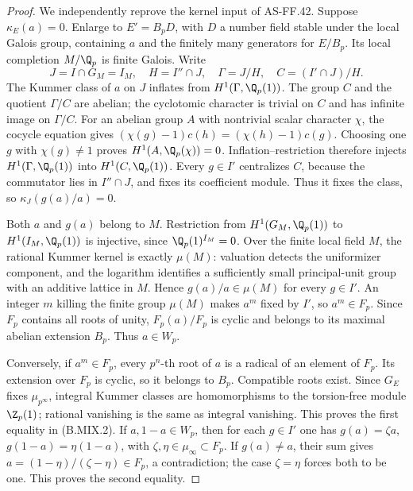\begin{proof}
We independently reprove the kernel input of AS-FF.42. Suppose
\(\kappa_E(a)=0\). Enlarge to \(E'=B_pD\), with \(D\) a number
field stable under the local Galois group, containing \(a\) and the
finitely many generators for \(E/B_p\). Its local completion
\(M/\Q_p\) is finite Galois. Write
\[
 J=I\cap G_M=I_M,\quad H=I''\cap J,
 \quad\Gamma=J/H,\quad C=(I'\cap J)/H.
\]
The Kummer class of \(a\) on \(J\) inflates from
\(H^1(\Gamma,\Q_p(1))\). The group \(C\) and the quotient
\(\Gamma/C\) are abelian; the cyclotomic character is trivial
on \(C\) and has infinite image on \(\Gamma/C\).
For an abelian group \(A\) with nontrivial scalar character \(\chi\),
the cocycle equation gives
\((\chi(g)-1)c(h)=(\chi(h)-1)c(g)\). Choosing one
\(g\) with \(\chi(g)\ne1\) proves \(H^1(A,\Q_p(\chi))=0\).
Inflation--restriction therefore injects
\(H^1(\Gamma,\Q_p(1))\) into \(H^1(C,\Q_p(1))\).
Every \(g\in I'\) centralizes \(C\), because the commutator
lies in \(I''\cap J\), and fixes its coefficient module.
Thus it fixes the class, so
\(\kappa_J(g(a)/a)=0\).

Both \(a\) and \(g(a)\) belong to \(M\). Restriction from
\(H^1(G_M,\Q_p(1))\) to \(H^1(I_M,\Q_p(1))\) is injective,
since \(\Q_p(1)^{I_M}=0\). Over the finite local field \(M\),
the rational Kummer kernel is exactly \(\mu(M)\): valuation
detects the uniformizer component, and the logarithm identifies a
sufficiently small principal-unit group with an additive lattice
in \(M\). Hence \(g(a)/a\in\mu(M)\) for every \(g\in I'\).
An integer \(m\) killing the finite group \(\mu(M)\) makes
\(a^m\) fixed by \(I'\), so \(a^m\in F_p\).
Since \(F_p\) contains all roots of unity,
\(F_p(a)/F_p\) is cyclic and belongs to its maximal abelian
extension \(B_p\). Thus \(a\in W_p\).

Conversely, if \(a^m\in F_p\), every \(p^n\)-th root of
\(a\) is a radical of an element of \(F_p\). Its extension
over \(F_p\) is cyclic, so it belongs to \(B_p\).
Compatible roots exist. Since \(G_E\) fixes \(\mu_{p^\infty}\),
integral Kummer classes are homomorphisms to the torsion-free
module \(\Z_p(1)\); rational vanishing is the same as integral
vanishing. This proves the first equality in (B.MIX.2).
If \(a,1-a\in W_p\), then for each \(g\in I'\) one has
\(g(a)=\zeta a\), \(g(1-a)=\eta(1-a)\), with
\(\zeta,\eta\in\mu_\infty\subset F_p\).
If \(g(a)\ne a\), their sum gives
\(a=(1-\eta)/(\zeta-\eta)\in F_p\), a contradiction;
the case \(\zeta=\eta\) forces both to be one.
This proves the second equality.


\end{proof}
